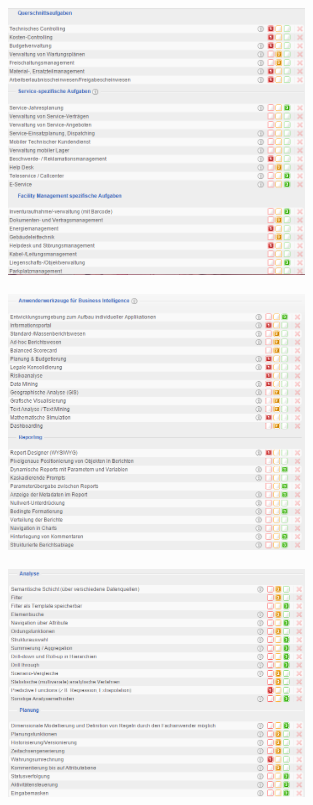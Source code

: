 \documentclass[12pt]{article}
\begin{document}
\begin{figure}[here!]
\centering
\includegraphics[width=0.7\textwidth]{images/tr30}
\end{figure}\FloatBarrier
\noindent
\begin{figure}[here!]
\centering
\includegraphics[width=0.7\textwidth]{images/tr31}
\end{figure}\FloatBarrier
\noindent
\begin{figure}[here!]
\centering
\includegraphics[width=0.7\textwidth]{images/tr32}
\end{figure}\FloatBarrier
\end{document}
